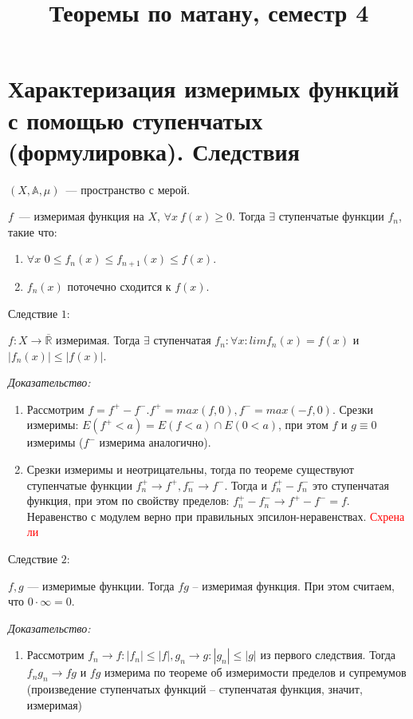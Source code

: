 \documentclass[paper=a4, fontsize=17pt]{article}
\title{Теоремы по матану, семестр 4}
\begin{document}
\maketitle
\tableofcontents
\newpage

\section{Характеризация измеримых функций с помощью ступенчатых (формулировка). Следствия}
$(X,\mathds{A},\mu)$~--- пространство с мерой.

$f$~--- измеримая функция на $X$, $\forall x\ f(x) \geq 0$. Тогда $\exists$ ступенчатые функции $f_n$, такие что:
\begin{enumerate}
    \item $\forall x$ $0 \leq f_n(x) \leq f_{n+1}(x) \leq f(x)$.
    \item $f_n(x)$ поточечно сходится к $f(x)$.
\end{enumerate}

Следствие $1$:

$f: X \rightarrow \overline {\mathds{R}}$ измеримая. Тогда $\exists$ ступенчатая $f_n: \forall x:  lim f_n(x) = f(x)$ и $|f_n(x)| \leq |f(x)|$.

\emph{Доказательство:}

\begin{enumerate}
	\item Рассмотрим $f = f^+ - f^-. f^+ = max(f, 0), f^- = max(-f, 0)$. Срезки измеримы: $E(f^+  < a) = E(f < a) \cap E(0 < a)$, при этом $f$  и $g \equiv 0$ измеримы ($f^-$ измерима аналогично).
	\item Срезки измеримы и неотрицательны, тогда по теореме существуют ступенчатые функции $f^+_n \rightarrow f^+, f^-_n \rightarrow f^-$. Тогда и $f^+_n - f^-_n$ это ступенчатая функция, при этом по свойству пределов: $f^+_n - f^-_n \rightarrow f^+ - f^- = f$. Неравенство с модулем верно при правильных эпсилон-неравенствах.
	\textcolor{red}{Схрена ли}
\end{enumerate}

Следствие $2$:

$f, g$ --- измеримые функции. Тогда $fg$ -- измеримая функция. При этом считаем, что $0 \cdot \infty = 0$.

\emph{Доказательство:}
\begin{enumerate}
	\item Рассмотрим $f_n \rightarrow f: |f_n| \leq |f|, g_n \rightarrow g: |g_n| \leq |g|$ из первого следствия. Тогда $f_ng_n \rightarrow fg$ и $fg$ измерима по теореме об измеримости пределов и супремумов (произведение ступенчатых функций -- ступенчатая функция, значит, измеримая)
\end{enumerate}
\end{document}
